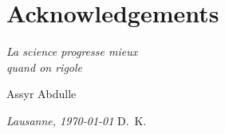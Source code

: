\chapter*{Acknowledgements}
\epigraph{\textit{La science progresse mieux \\ quand on rigole}}{Assyr Abdulle}

\lipsum[1-2]

\bigskip
 
\noindent\textit{Lausanne, \today}
\hfill D.~K.
